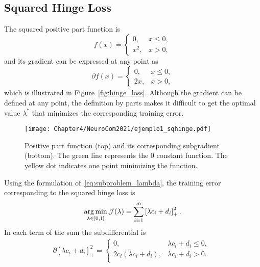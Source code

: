 \subsection{Squared Hinge Loss}
The squared positive part function is
\begin{equation}
    \nonumber
    f(x) = 
    \begin{cases}
    0 ,& x \leq 0, \\
    x^2 ,& x > 0  ,
    \end{cases}
\end{equation}
and its gradient can be expressed at any point as
\begin{equation}
    \nonumber
    \partial f(x) = 
    \begin{cases}
    0 ,& x \leq 0, \\
    2x ,& x > 0 ,
    \end{cases}
\end{equation}
which is illustrated in Figure~\ref{fig:hinge_loss}.
Although the gradient can be defined at any point, the definition by parts makes it difficult to get the optimal value $\lambda^*$ that minimizes the corresponding training error.
\begin{figure}[t!]
    \centering
    \texttt{[image: Chapter4/NeuroCom2021/ejemplo1\_sqhinge.pdf]}
    \caption{Positive part function (top) and its corresponding subgradient (bottom). The green line represents the $0$ constant function. The yellow dot indicates one point minimizing the function.}
    \label{fig:sqhinge_loss}
\end{figure}
Using the formulation of~\eqref{eq:subproblem_lambda}, the training error corresponding to the squared hinge loss is
\begin{equation}
    \label{eq:opt_hinge_l2}
    \argmin_{\lambda \in [0, 1]} \mathcal{J}(\lambda) = \sum_{i=1}^{\npertask} \pospart{\lambda c_i + d_i}^2.
\end{equation}
In each term of the sum the subdifferential is 
\begin{equation}
    \label{eq:subdiff_hinge_l2}
    \begin{aligned}
        \partial \left[\lambda c_i + d_i \right]_+^2 = 
    \begin{cases}
        0 ,& \lambda c_i + d_i  \leq 0 , \\
        2 c_i (\lambda c_i + d_i) ,& \lambda c_i + d_i  > 0 . \\
    \end{cases} \;
    \end{aligned}
\end{equation}
